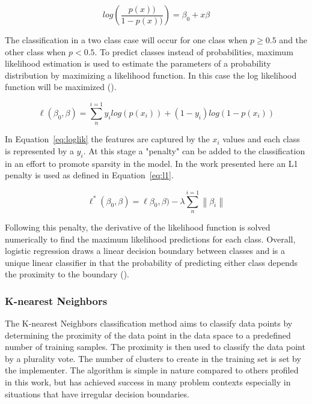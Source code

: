 \documentclass{article}
\begin{document}
\begin{equation}\label{eq:lr}
log\left (  \frac{p(x))}{1 - p(x))}\right ) = \beta_{0} + x\beta
\end{equation}

The classification in a two class case will occur for one class when $p \geq 0.5$ and the other class when $p < 0.5$. To predict classes instead of probabilities, maximum likelihood estimation is used to estimate the parameters of a probability distribution by maximizing a likelihood function. In this case the log likelihood function will be maximized (\cite{Shalizi2012AdvancedDA}).

\begin{equation}\label{eq:loglik}
\ell(\beta_{0}, \beta) = \sum_{n}^{i=1}y_{i}log(p(x_{i})) + (1-y_{i})log(1 - p(x_{i}))
\end{equation}

In Equation~\ref{eq:loglik} the features are captured by the $x_{i}$ values and each class is represented by a $y_{i}$. At this stage a "penalty" can be added to the classification in an effort to promote sparsity in the model. In the work presented here an L1 penalty is used as defined in Equation~\ref{eq:l1}.

\begin{equation}\label{eq:l1}
\ell^{*}(\beta_{0}, \beta) = \ell\beta_{0}, \beta) - \lambda\sum_{n}^{i=1}\left \| \beta_{i} \right \|
\end{equation}

Following this penalty, the derivative of the likelihood function is solved numerically to find the maximum likelihood predictions for each class. Overall, logistic regression draws a linear decision boundary between classes and is a unique linear classifier in that the probability of predicting either class depends the proximity to the boundary (\cite{Shalizi2012AdvancedDA}).

\subsubsection{K-nearest Neighbors}
The K-nearest Neighbors classification method aims to classify data points by determining the proximity of the data point in the data space to a predefined number of training samples. The proximity is then used to classify the data point by a plurality vote. The number of clusters to create in the training set is set by the implementer. The algorithm is simple in nature compared to others profiled in this work, but has achieved success in many problem contexts especially in situations that have irregular decision boundaries.
\end{document}
